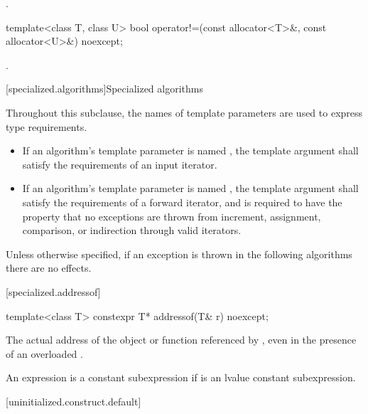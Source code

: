 \begin{itemdescr}
\pnum
\returns
{}.
\end{itemdescr}

%
\begin{itemdecl}
template<class T, class U>
  bool operator!=(const allocator<T>&, const allocator<U>&) noexcept;
\end{itemdecl}

\begin{itemdescr}
\pnum
\returns
{}.
\end{itemdescr}

[specialized.algorithms]{Specialized algorithms}

\pnum
Throughout this subclause,
the names of template parameters are used to express type requirements.
\begin{itemize}
\item
If an algorithm's template parameter is named ,
the template argument shall satisfy the requirements
of an input iterator.
\item
If an algorithm's template parameter is named ,
the template argument shall satisfy the requirements
of a forward iterator, and
is required to have the property that no exceptions are thrown
from increment, assignment, comparison, or indirection through valid iterators.
\end{itemize}
Unless otherwise specified,
if an exception is thrown in the following algorithms there are no effects.

[specialized.addressof]{}

%
\begin{itemdecl}
template<class T> constexpr T* addressof(T& r) noexcept;
\end{itemdecl}

\begin{itemdescr}
\pnum
\returns The actual address of the object or function referenced by , even in the
presence of an overloaded .

\pnum
\remarks An expression 
is a constant subexpression
if  is an lvalue constant subexpression.
\end{itemdescr}

[uninitialized.construct.default]{}

